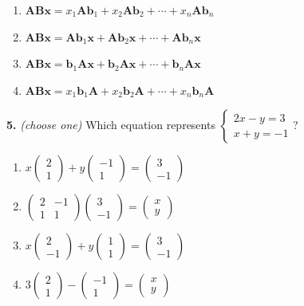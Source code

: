 \documentclass[10pt,a4paper]{article}
\begin{document}
\begin{enumerate}[label=(\Alph*)]
\item \(\mathbf{ABx}=x_1\mathbf{Ab}_1+x_2\mathbf{Ab}_2+\cdots+x_n\mathbf{Ab}_n\)
\item \(\mathbf{ABx}=\mathbf{Ab}_1\mathbf{x}+\mathbf{Ab}_2\mathbf{x}+\cdots+\mathbf{Ab}_n\mathbf{x}\)
\item \(\mathbf{ABx}=\mathbf{b}_1\mathbf{Ax}+\mathbf{b}_2\mathbf{Ax}+\cdots+\mathbf{b}_n\mathbf{Ax}\)
\item \(\mathbf{ABx}=x_1\mathbf{b}_1\mathbf{A}+x_2\mathbf{b}_2\mathbf{A}+\cdots+x_n\mathbf{b}_n\mathbf{A}\)
\end{enumerate}
\smallskip
\textbf{5.} \textit{(choose one)} Which equation represents \(\left\{\begin{array}{c}2x-y=3\\x+y=-1\end{array}\right.\)?

\begin{enumerate}[label=(\Alph*)]
\item \(x\begin{pmatrix}2\\1\end{pmatrix}+y\begin{pmatrix}-1\\1\end{pmatrix}=\begin{pmatrix}3\\-1\end{pmatrix}\)
\item \(\begin{pmatrix}2&-1\\1&1\end{pmatrix}\begin{pmatrix}3\\-1\end{pmatrix}=\begin{pmatrix}x\\y\end{pmatrix}\)
\item \(x\begin{pmatrix}2\\-1\end{pmatrix}+y\begin{pmatrix}1\\1\end{pmatrix}=\begin{pmatrix}3\\-1\end{pmatrix}\)
\item \(3\begin{pmatrix}2\\1\end{pmatrix}-\begin{pmatrix}-1\\1\end{pmatrix}=\begin{pmatrix}x\\y\end{pmatrix}\)
\end{enumerate}
\smallskip
\end{document}
